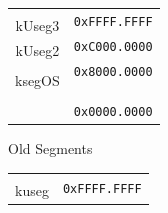\documentclass[12pt,a4paper,openright,twoside]{report}
\begin{document}
\begin{figure}[h]
	\centering
	\begin{subfigure}[b]{0.4\textwidth}
		\renewcommand{\arraystretch}{0.66}
		\begin{tabular}{cl}
			\multicolumn{1}{m{3cm}}{}                     & \multirow{2}{*}{\texttt{0xFFFF.FFFF}} \\ \cline{1-1}
			\multicolumn{1}{|c|}{\multirow{2}{*}{kUseg3}} &                                       \\
			\multicolumn{1}{|c|}{}                        & \multirow{2}{*}{\texttt{0xC000.0000}} \\ \cline{1-1}
			\multicolumn{1}{|c|}{\multirow{2}{*}{kUseg2}} &                                       \\
			\multicolumn{1}{|c|}{}                        & \multirow{2}{*}{\texttt{0x8000.0000}} \\ \cline{1-1}
			\multicolumn{1}{|c|}{\multirow{8}{*}{ksegOS}} &                                       \\
			\multicolumn{1}{|c|}{}                        & \multirow{2}{*}{}                     \\
			\multicolumn{1}{|c|}{}                        &                                       \\
			\multicolumn{1}{|c|}{}                        & \multirow{2}{*}{}                     \\
			\multicolumn{1}{|c|}{}                        &                                       \\
			\multicolumn{1}{|c|}{}                        & \multirow{2}{*}{}                     \\
			\multicolumn{1}{|c|}{}                        &                                       \\
			\multicolumn{1}{|c|}{}                        & \multirow{2}{*}{\texttt{0x0000.0000}} \\ \cline{1-1}
			\multicolumn{1}{l}{}                          &
		\end{tabular}
		\caption{Old Segments}
		\label{fig:old_segments}
	\end{subfigure}
	\qquad
	\qquad
	\begin{subfigure}[b]{0.4\textwidth}
		\renewcommand{\arraystretch}{0.66}
		\begin{tabular}{cl}
			\multicolumn{1}{m{3cm}}{}                    & \multirow{2}{*}{\texttt{0xFFFF.FFFF}} \\ \cline{1-1}
			\multicolumn{1}{|c|}{\multirow{4}{*}{kuseg}} &                                       \\

\end{tabular}
\end{subfigure}
\end{figure}
\end{document}
